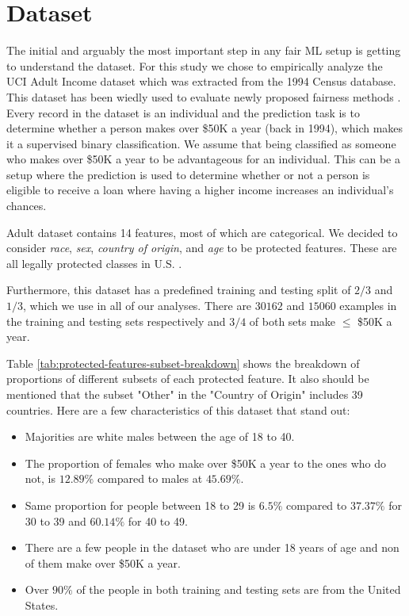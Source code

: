 \section{Dataset} \label{sec:dataset}
The initial and arguably the most important step in any fair ML setup is getting to understand the dataset. For this study we chose to empirically analyze the UCI Adult Income dataset \cite{Dua:2017} which was extracted from the 1994 Census database. This dataset has been wiedly used to evaluate newly proposed fairness methods \cite{zafar2017fairness, zafar2017parity, pleiss2017fairness, calmon2017optimized}. Every record in the dataset is an individual and the prediction task is to determine whether a person makes over \$50K a year (back in 1994), which makes it a supervised binary classification. We assume that being classified as someone who makes over \$50K a year to be advantageous for an individual. This can be a setup where the prediction is used to determine whether or not a person is eligible to receive a loan where having a higher income increases an individual's chances.

Adult dataset contains 14 features, most of which are categorical. We decided to consider \textit{race}, \textit{sex}, \textit{country of origin}, and \textit{age} to be protected features. These are all legally protected classes in U.S. \cite{calmon2017optimized}.

Furthermore, this dataset has a predefined training and testing split of $2/3$ and $1/3$, which we use in all of our analyses. There are $30162$ and $15060$ examples in the training and testing sets respectively and $3/4$ of both sets make $\leq$ \$50K a year. 

Table \ref{tab:protected-features-subset-breakdown} shows the breakdown of proportions of different subsets of each protected feature. It also should be mentioned that the subset "Other" in the "Country of Origin" includes 39 countries. Here are a few characteristics of this dataset that stand out:

\begin{itemize}
	\item Majorities are white males between the age of 18 to 40.
	\item The proportion of females who make over \$50K a year to the ones who do not, is $12.89\%$ compared to males at $45.69\%$.
	\item Same proportion for people between 18 to 29 is $6.5\%$ compared to $37.37\%$ for 30 to 39 and $60.14\%$ for 40 to 49.
	\item There are a few people in the dataset who are under 18 years of age and non of them make over \$50K a year.
	\item Over $90\%$ of the people in both training and testing sets are from the United States. 
\end{itemize}


